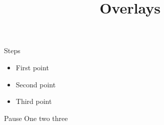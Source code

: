 \documentclass{beamer}
\title{Overlays}
\begin{document}
\begin{frame}{Steps}
  \begin{itemize}
    \item<1-> First point
    \item<2-> Second point
    \item<3-> Third point
  \end{itemize}
\end{frame}
\begin{frame}{Pause}
  One \pause two \pause three
\end{frame}
\end{document}
